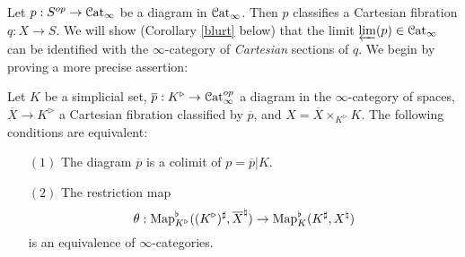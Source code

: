 Let $p: S^{op} \rightarrow \operatorname{\mathcal{C}at}_{\infty}$ be a diagram in $\operatorname{\mathcal{C}at}_{\infty}$. Then $p$ classifies
a Cartesian fibration $q: X \rightarrow S$. We will show (Corollary \ref{blurt} below) that
the limit $\varprojlim(p) \in \operatorname{\mathcal{C}at}_{\infty}$ can be identified with the $\infty$-category of {\em Cartesian} sections of $q$. We begin by proving a more precise assertion:

\begin{proposition}\label{charcatlimit}
Let $K$ be a simplicial set, $\overline{p}: K^{\triangleright} \rightarrow \operatorname{\mathcal{C}at}^{op}_{\infty}$ a diagram
in the $\infty$-category of spaces, $\overline{X} \rightarrow K^{\triangleright}$ a Cartesian fibration classified by $\overline{p}$, and $X = \overline{X} \times_{K^{\triangleright}} K$. 
The following conditions are equivalent:
\begin{itemize}
\item[$(1)$] The diagram $\overline{p}$ is a colimit of $p = \overline{p} | K$.

\item[$(2)$] The restriction map
$$ \theta: \operatorname{{Map}}^{\flat}_{K^{\triangleright}}( (K^{\triangleright})^{\sharp}, \overline{X}^{\natural}) \rightarrow \operatorname{{Map}}^{\flat}_{K}(K^{\sharp}, X^{\natural})$$
is an equivalence of $\infty$-categories.
\end{itemize}
\end{proposition}

